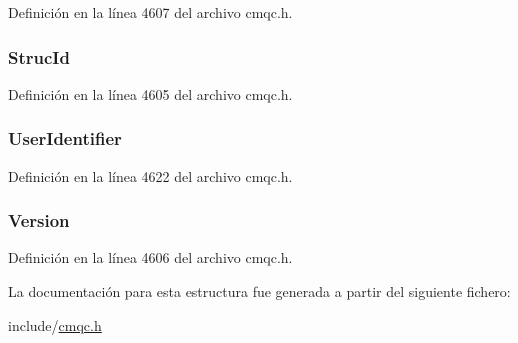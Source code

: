 Definición en la línea 4607 del archivo cmqc.\+h.

\hypertarget{structtag_m_q_m_d2_a0530922ca944569b52601d74941f96e4}{}
\subsubsection[{Struc\+Id}]{ Struc\+Id}\label{structtag_m_q_m_d2_a0530922ca944569b52601d74941f96e4}


Definición en la línea 4605 del archivo cmqc.\+h.

\hypertarget{structtag_m_q_m_d2_a46cc458e507d74cea87ed00b97695f65}{}
\subsubsection[{User\+Identifier}]{ User\+Identifier}\label{structtag_m_q_m_d2_a46cc458e507d74cea87ed00b97695f65}


Definición en la línea 4622 del archivo cmqc.\+h.

\hypertarget{structtag_m_q_m_d2_a0656ef8f766b3907d394d88a35d7b7e9}{}
\subsubsection[{Version}]{ Version}\label{structtag_m_q_m_d2_a0656ef8f766b3907d394d88a35d7b7e9}


Definición en la línea 4606 del archivo cmqc.\+h.



La documentación para esta estructura fue generada a partir del siguiente fichero\+:\begin{DoxyCompactItemize}
\item 
include/\hyperlink{cmqc_8h}{cmqc.\+h}\end{DoxyCompactItemize}
